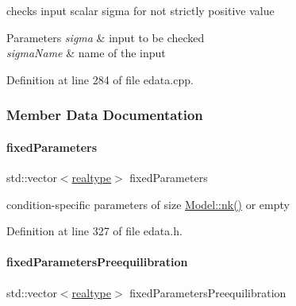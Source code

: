 checks input scalar sigma for not strictly positive value


\begin{DoxyParams}{Parameters}
{\em sigma} & input to be checked \\
\hline
{\em sigma\+Name} & name of the input \\
\hline
\end{DoxyParams}


Definition at line 284 of file edata.\+cpp.



\subsubsection{Member Data Documentation}
\mbox{\label{classamici_1_1_exp_data_ac1d5115134ec1c839f1e913724ceb2b4}} 
\paragraph{\texorpdfstring{fixed\+Parameters}{fixedParameters}}
{\footnotesize\ttfamily std\+::vector$<$\mbox{\hyperlink{namespaceamici_a1bdce28051d6a53868f7ccbf5f2c14a3}{realtype}}$>$ fixed\+Parameters}

condition-\/specific parameters of size \mbox{\hyperlink{classamici_1_1_model_a3d4130da64883565a06a86e7d6029da1}{Model\+::nk()}} or empty 

Definition at line 327 of file edata.\+h.

\mbox{\label{classamici_1_1_exp_data_acee836e015941b3984c44e1c7423b101}} 
\paragraph{\texorpdfstring{fixed\+Parameters\+Preequilibration}{fixedParametersPreequilibration}}
{\footnotesize\ttfamily std\+::vector$<$\mbox{\hyperlink{namespaceamici_a1bdce28051d6a53868f7ccbf5f2c14a3}{realtype}}$>$ fixed\+Parameters\+Preequilibration}

